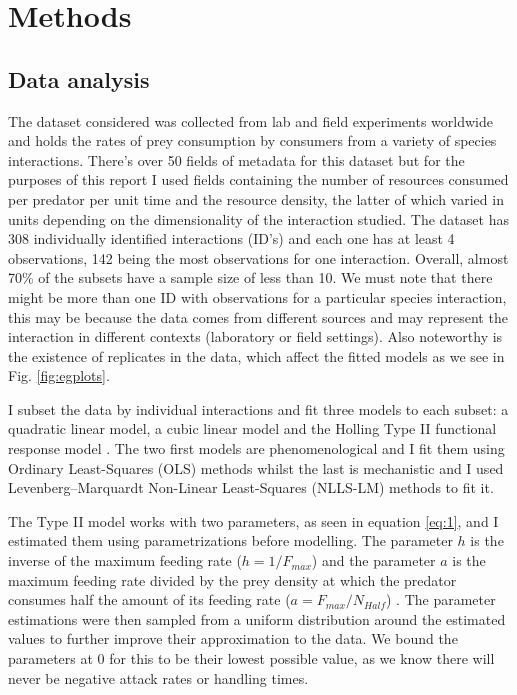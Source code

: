 \documentclass[11pt]{article}
\begin{document}
  \section{Methods}
    \subsection{Data analysis}
    
    The dataset considered was collected from lab and field experiments worldwide and holds the rates of prey consumption by consumers from a variety of species interactions. There's over 50 fields of metadata for this dataset but for the purposes of this report I used fields containing the number of resources consumed per predator per unit time and the resource density, the latter of which varied in units depending on the dimensionality of the interaction studied. The dataset has 308 individually identified interactions (ID’s) and each one has at least 4 observations, 142 being the most observations for one interaction. Overall, almost 70\% of the subsets have a sample size of less than 10. We must note that there might be more than one ID with observations for a particular species interaction, this may be because the data comes from different sources and may represent the interaction in different contexts (laboratory or field settings). Also noteworthy is the existence of replicates in the data, which affect the fitted models as we see in Fig. \ref{fig:egplots}.
    
    I subset the data by individual interactions and fit three models to each subset: a quadratic linear model, a cubic linear model and the Holling Type II functional response model \cite{Holling1959}. The two first models are phenomenological and I fit them using Ordinary Least-Squares (OLS) methods whilst the last is mechanistic and I used Levenberg–Marquardt Non-Linear Least-Squares (NLLS-LM) methods to fit it.  
    
    The Type II model works with two parameters, as seen in equation \eqref{eq:1}, and I estimated them using parametrizations before modelling. The parameter $h$ is the inverse of the maximum feeding rate ($h=1/F_{max}$) and the parameter $a$ is the maximum feeding rate divided by the prey density at which the predator consumes half the amount of its feeding rate ($a=F_{max}/N_{Half}$) \cite{Real1977, Rosenbaum2018}. The parameter estimations were then sampled from a uniform distribution around the estimated values to further improve their approximation to the data. We bound the parameters at 0 for this to be their lowest possible value, as we know there will never be negative attack rates or handling times.
    
\end{document}

